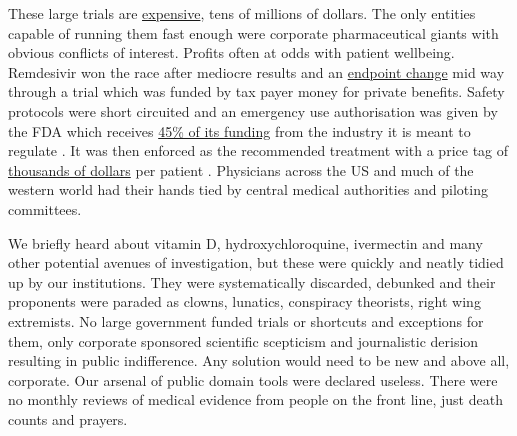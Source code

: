 \documentclass[11pt,a4paper,notitlepage]{report}
\begin{document}
These large trials are \href{https://www.sofpromed.com/what-is-the-cost-of-a-clinical-trial}{expensive}, tens of millions of dollars. The only entities capable of running them  fast enough were corporate pharmaceutical giants with obvious conflicts of interest. Profits often at odds with patient wellbeing. Remdesivir won the race after mediocre results and an \href{https://blogs.bmj.com/bmj/2020/06/10/remdesivir-in-the-plague-year-observations-of-the-most-remarkable-occurences/}{endpoint change} mid way through a trial \cite{bmj10062020} which was funded by tax payer money for private benefits. Safety protocols were short circuited and an emergency use authorisation was given by the FDA which receives \href{https://today.uconn.edu/2021/05/why-is-the-fda-funded-in-part-by-the-companies-it-regulates-2/#}{45\% of its funding} from the industry it is meant to regulate \cite{uconn21052021}. It was then enforced as the recommended treatment with a price tag of \href{https://www.ajmc.com/view/gilead-sciences-sets-us-price-for-covid19-drug-at-2340-to-3120-based-on-insurance}{thousands of dollars} per patient \cite{ajcm20062020}. Physicians across the US and much of the western world had their hands tied by central medical authorities and piloting committees. 

We briefly heard about vitamin D, hydroxychloroquine, ivermectin and many other potential avenues of investigation, but these were quickly and neatly tidied up by our institutions. They were systematically discarded, debunked and their proponents were paraded as clowns, lunatics, conspiracy theorists, right wing extremists. No large government funded trials or shortcuts and exceptions for them, only corporate sponsored scientific scepticism and journalistic derision resulting in public indifference. Any solution would need to be new and above all, corporate. Our arsenal of public domain tools were declared useless. There were no monthly reviews of medical evidence from people on the front line, just death counts and prayers.
\end{document}

